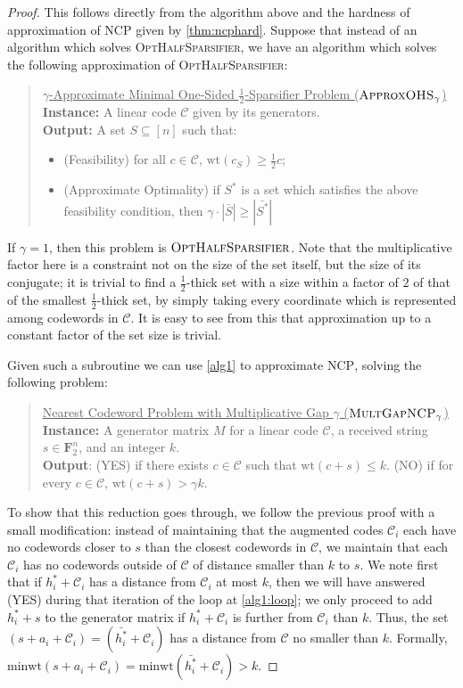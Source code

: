 \documentclass{article}
\newcommand{\FF}{\mathbf{F}}
\newcommand{\NCP}{\textsc{NCP}}
\newcommand{\MultGapNCP}{\textsc{Mult\-Gap\-NCP}}
\newcommand{\OptHalfSparsifier}{\textsc{Opt\-Half\-Sparsifier}}
\newcommand{\ApproxOHS}{\textsc{Approx\-OHS}}
\newcommand{\calC}{\mathcal{C}}
\newcommand{\wt}{\text{wt}}
\newcommand{\minwt}{\text{minwt}}
\begin{document}
\thmapprox*
\begin{proof}
This follows directly from the algorithm above and the hardness of approximation of {\NCP} given by \cref{thm:ncphard}. Suppose that instead of an algorithm which solves {\OptHalfSparsifier}, we have an algorithm which solves the following approximation of {\OptHalfSparsifier}:
\begin{quote}
    \underline{$\gamma$-Approximate Minimal One-Sided $\frac12$-Sparsifier Problem ($\ApproxOHS_\gamma$)}\\
    \textbf{Instance:} A linear code $\calC$ given by its generators.\\
    \textbf{Output:} A set $S \subseteq [n]$ such that:
    \begin{itemize}
    \item (Feasibility) for all $c \in \calC$, $\wt(c_S) \geq \frac{1}{2}c$;
    \item (Approximate Optimality) if $S^*$ is a set which satisfies the above feasibility condition, then $\gamma \cdot|\bar{S}| \geq |\bar{S^*}|$
    \end{itemize}
\end{quote}

If $\gamma=1$, then this problem is $\OptHalfSparsifier$. Note that the multiplicative factor here is a constraint not on the size of the set itself, but the size of its conjugate; it is trivial to find a $\frac12$-thick set with a size within a factor of $2$ of that of the smallest $\frac12$-thick set, by simply taking every coordinate which is represented among codewords in $\calC$. It is easy to see from this that approximation up to a constant factor of the set size is trivial.

Given such a subroutine we can use \autoref{alg1} to approximate {\NCP}, solving the following problem:

\begin{quote}
\underline{Nearest Codeword Problem with Multiplicative Gap $\gamma$ ($\MultGapNCP_\gamma$)}\\
\textbf{Instance:} A generator matrix $M$ for a linear code $\calC$, a received string $s \in \FF_2^n$, and an integer $k$.\\
\textbf{Output}: (YES) if there exists $c \in \calC$ such that $\wt(c + s) \leq k$. (NO) if for every $c \in \calC$, $\wt(c + s) > \gamma k$.
\end{quote}

To show that this reduction goes through, we follow the previous proof with a small modification: instead of maintaining that the augmented codes $\calC_i$ each have no codewords closer to $s$ than the closest codewords in $\calC$, we maintain that each $\calC_i$ has no codewords outside of $\calC$ of distance smaller than $k$ to $s$. We note first that if $h^*_i + \calC_i$ has a distance from $\calC_i$ at most $k$, then we will have answered (YES) during that iteration of the loop at \autoref{alg1:loop}; we only proceed to add $h^*_i + s$ to the generator matrix if $h^*_i + \calC_i$ is further from $\calC_i$ than $k$. Thus, the set $(s + a_i + \calC_i) = (\bar{h^*_i} + \calC_i)$ has a distance from $\calC$ no smaller than $k$. Formally, $\minwt(s + a_i + \calC_i) = \minwt(\bar{h^*_i} + \calC_i) > k$.


\end{proof}
\end{document}
